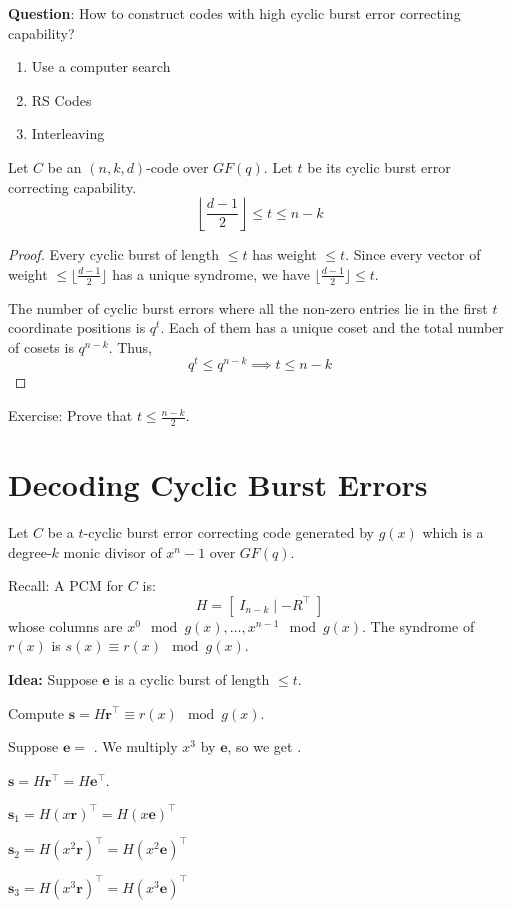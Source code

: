 \textbf{Question}: How to construct codes with high cyclic burst error
correcting capability?
\begin{enumerate}[(1)]
    \item Use a computer search
    \item RS Codes
    \item Interleaving
\end{enumerate}

\begin{thmbox}
    \begin{theorem}
        Let $ C $ be an $ (n,k,d) $-code over $ GF(q) $. Let $ t $ be its
        cyclic burst error correcting capability.
        \[ \left\lfloor \frac{d-1}{2} \right\rfloor \leqslant t \leqslant n-k \]  
    \end{theorem}
\end{thmbox}

\begin{proof}
    Every cyclic burst of length $ \leqslant t $ has weight $ \leqslant t $.
    Since every vector of weight $ \leqslant \lfloor \frac{d-1}{2} \rfloor $
    has a unique syndrome, we have $ \lfloor \frac{d-1}{2} \rfloor \leqslant t $. 

    The number of cyclic burst errors where all the non-zero entries lie in the first
    $ t $ coordinate positions is $ q^t $. Each of them has a unique coset
    and the total number of cosets is $ q^{n-k} $. Thus,
    \[ q^t\leqslant q^{n-k}\implies t\leqslant n-k \]
\end{proof}

Exercise: Prove that $ t\leqslant \frac{n-k}{2} $.

\section{Decoding Cyclic Burst Errors}
Let $ C $ be a $ t $-cyclic burst error correcting code generated
by $ g(x) $ which is a degree-$ k $ monic divisor of $ x^n-1 $ over $ GF(q) $.

Recall: A PCM for $ C $ is:
\[ H= \left[\; I_{n-k}\mid -R^\top \;\right] \]
whose columns are $ x^0 \mod g(x),\ldots ,x^{n-1} \mod g(x) $.
The syndrome of $ r(x) $ is $ s(x)\equiv r(x)\mod g(x) $.

\textbf{Idea:} Suppose $ \bm{e} $ is a cyclic burst of length $ \leqslant t $.

Compute $ \bm{s}=H\bm{r}^\top\equiv r(x)\mod g(x) $.

Suppose $ \bm{e}= $  . We multiply $ x^3 $ by $ \bm{e} $,
so we get .

$ \bm{s}=H\bm{r}^\top=H\bm{e}^\top $.

$ \bm{s}_1=H(x\bm{r})^\top = H(x\bm{e})^\top $

$ \bm{s}_2=H(x^2\bm{r})^\top = H(x^2\bm{e})^\top $

$ \bm{s}_3=H(x^3\bm{r})^\top = H(x^3\bm{e})^\top $
